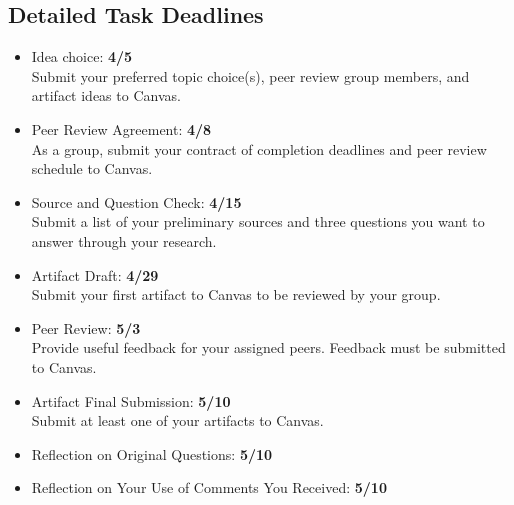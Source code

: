 \documentclass[12pt]{article}
\begin{document}
	\subsection*{Detailed Task Deadlines}
	\begin{itemize}
		\item Idea choice: \textbf{4/5} \\
		Submit your preferred topic choice(s), peer review group members, and artifact ideas to Canvas.
		\item Peer Review Agreement: \textbf{4/8}\\
		As a group, submit your contract of completion deadlines and peer review schedule to Canvas.
		\item Source and Question Check: \textbf{4/15} \\
		Submit a list of your preliminary sources and three questions you want to answer through your research.
		\item Artifact Draft: \textbf{4/29}\\
		Submit your first artifact to Canvas to be reviewed by your group.
		\item Peer Review: \textbf{5/3}\\
		Provide useful feedback for your assigned peers. Feedback must be submitted to Canvas.
		\item Artifact Final Submission: \textbf{5/10}\\
		Submit at least one of your artifacts to Canvas.
		\item Reflection on Original Questions: \textbf{5/10}
		\item Reflection on Your Use of Comments You Received: \textbf{5/10}
	\end{itemize}
\end{document}

